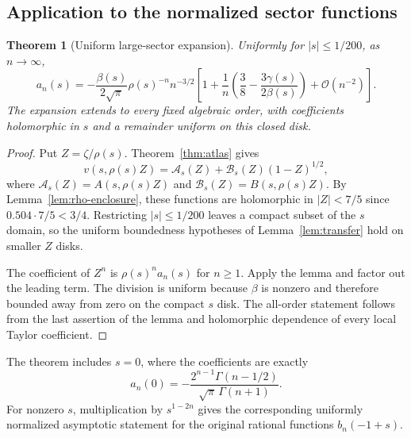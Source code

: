 \documentclass[11pt,a4paper]{article}
\newtheorem{theorem}{Theorem}[section]
\theoremstyle{definition}
\theoremstyle{remark}
\newcommand{\OO}{\mathcal O}
\begin{document}
\subsection{Application to the normalized sector functions}
\begin{theorem}[Uniform large-sector expansion]\label{thm:large-n}
Uniformly for $|s|\le1/200$, as $n\to\infty$,
\begin{equation}\label{eq:large-n}
 a_n(s)=-\frac{\beta(s)}{2\sqrt\pi}\rho(s)^{-n}n^{-3/2}
 \left[1+\frac{1}{n}
      \left(\frac38-\frac{3\gamma(s)}{2\beta(s)}\right)
       +\OO(n^{-2})\right].
\end{equation}
The expansion extends to every fixed algebraic order, with coefficients
holomorphic in $s$ and a remainder uniform on this closed disk.
\end{theorem}
\begin{proof}
Put $Z=\zeta/\rho(s)$. Theorem~\ref{thm:atlas} gives
\[
 v(s,\rho(s)Z)
 =\mathcal A_s(Z)+\mathcal B_s(Z)(1-Z)^{1/2},
\]
where $\mathcal A_s(Z)=A(s,\rho(s)Z)$ and
$\mathcal B_s(Z)=B(s,\rho(s)Z)$.
By Lemma~\ref{lem:rho-enclosure}, these functions are holomorphic in
$|Z|<7/5$ since $0.504\cdot7/5<3/4$. Restricting $|s|\le1/200$
leaves a compact subset of the $s$ domain, so the uniform boundedness
hypotheses of Lemma~\ref{lem:transfer} hold on smaller $Z$ disks.

The coefficient of $Z^n$ is $\rho(s)^n a_n(s)$ for $n\ge1$. Apply the
lemma and factor out the leading term. The division is uniform because
$\beta$ is nonzero and therefore bounded away from zero on the compact
$s$ disk. The all-order statement follows from the last assertion of the
lemma and holomorphic dependence of every local Taylor coefficient.
\end{proof}

The theorem includes $s=0$, where the coefficients are exactly
\begin{equation}\label{eq:a0-gamma}
 a_n(0)=-\frac{2^{n-1}\Gamma(n-1/2)}{\sqrt\pi\,\Gamma(n+1)}.
\end{equation}
For nonzero $s$, multiplication by $s^{1-2n}$ gives the corresponding
uniformly normalized asymptotic statement for the original rational
functions $b_n(-1+s)$.
\end{document}
